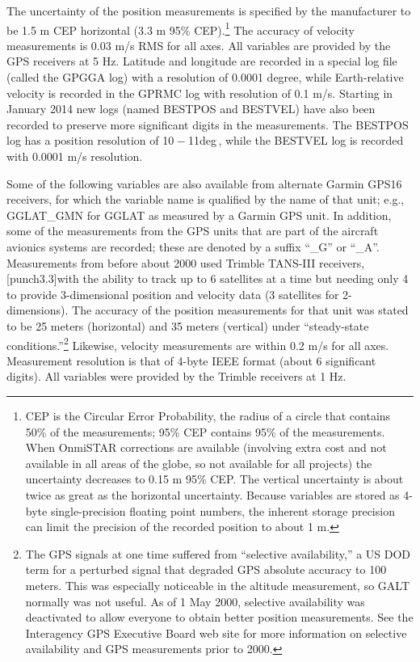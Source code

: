 \documentclass[
  english,
]{book}
\begin{document}
The uncertainty of the position measurements is specified by the manufacturer to be 1.5 m CEP horizontal (3.3 m 95\% CEP).\footnote{CEP is the Circular Error Probability, the radius of a circle that contains 50\% of the measurements; 95\% CEP contains 95\% of the measurements. When OnmiSTAR corrections are available (involving extra cost and not available in all areas of the globe, so not available for all projects) the uncertainty decreases to 0.15 m 95\% CEP. The vertical uncertainty is about twice as great as the horizontal uncertainty. Because variables are stored as 4-byte single-precision floating point numbers, the inherent storage precision can limit the precision of the recorded position to about 1 m.}
The accuracy of velocity measurements is 0.03 m/s RMS for all axes. All variables are provided by the GPS receivers at 5 Hz. Latitude and longitude are recorded in a special log file (called the GPGGA log) with a resolution of 0.0001 degree, while Earth-relative velocity is recorded in the GPRMC log with resolution of 0.1 m/s. Starting in January 2014 new logs (named BESTPOS and BESTVEL) have also been recorded to preserve more significant digits in the measurements. The BESTPOS log has a position resolution of {10 − 11deg }, while the BESTVEL log is recorded with 0.0001 m/s resolution.

Some of the following variables are also available from alternate Garmin GPS16 receivers, for which the variable name is qualified by the name of that unit; e.g., GGLAT\_GMN for GGLAT as measured by a Garmin GPS unit. In addition, some of the measurements from the GPS units that are part of the aircraft avionics systems are recorded; these are denoted by a suffix ``\_G'' or ``\_A''. Measurements from before about 2000 used Trimble TANS-III receivers, \protect\hypertarget{punch3.3}{}{{[}punch3.3{]}}with the ability to track up to 6 satellites at a time but needing only 4 to provide 3-dimensional position and velocity data (3 satellites for 2-dimensions). The accuracy of the position measurements for that unit was stated to be 25 meters (horizontal) and 35 meters (vertical) under ``steady-state conditions.''\footnote{The GPS signals at one time suffered from ``selective availability,'' a US DOD term for a perturbed signal that degraded GPS absolute accuracy to 100 meters. This was especially noticeable in the altitude measurement, so GALT normally was not useful. As of 1 May 2000, selective availability was deactivated to allow everyone to obtain better position measurements. See the Interagency GPS Executive Board web site for more information on selective availability and GPS measurements prior to 2000.}
Likewise, velocity measurements are within 0.2 m/s for all axes. Measurement resolution is that of 4-byte IEEE format (about 6 significant digits). All variables were provided by the Trimble receivers at 1 Hz.
\end{document}
